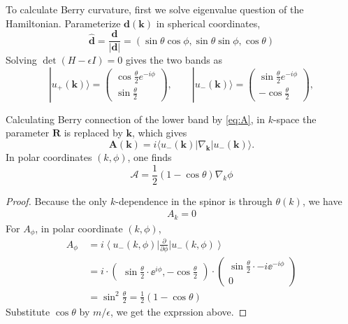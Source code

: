 \documentclass[12pt,a4paper]{article}
\newcommand{\bra}[1]{\left\langle{#1}\right|}
\newcommand{\ket}[1]{\left|{#1}\right\rangle}
\begin{document}
    To calculate Berry curvature, first we solve eigenvalue question of the Hamiltonian. Parameterize $\mathbf{d}(\mathbf{k})$ in spherical coordinates,
    \[
        \hat{\mathbf{d}}
        = \frac{\mathbf{d}}{|\mathbf{d}|}
        = (\sin\theta \cos\phi, \sin\theta \sin\phi, \cos\theta)
    \]
    Solving $\det(H-\epsilon I)=0$ gives the two bands as
    \begin{equation}
        |u_+(\mathbf k)\rangle =
        \begin{pmatrix}
        \cos\frac{\theta}{2}e^{-i\phi} \\
        \sin\frac{\theta}{2}
        \end{pmatrix}, \qquad
        |u_-(\mathbf k)\rangle =
        \begin{pmatrix}
        \sin\frac{\theta}{2}e^{-i\phi} \\
        -\cos\frac{\theta}{2}
        \end{pmatrix},
    \end{equation}

    Calculating Berry connection of the lower band by \eqref{eq:A}, in $k$-space the parameter $\mathbf{R}$ is replaced by $\mathbf{k}$, which gives
    \begin{equation}
        \mathbf A(\mathbf k)
        = i \langle u_-(\mathbf k) | \nabla_{\mathbf k} |u_-(\mathbf k)\rangle.
    \end{equation}
    In polar coordinates $(k,\phi)$, one finds
    \begin{equation}
        \mathcal{A} = \frac{1}{2}\left(1 - \cos\theta\right) \nabla_k\phi
    \end{equation}
    \begin{proof}\small
    Because the only $k$-dependence in the spinor is through $\theta(k)$, we have
    \[\begin{aligned}
        A_k = 0
    \end{aligned}\]
    For $A_\phi$, in polar coordinate $(k,\phi)$,
    \[\begin{aligned}
        A_\phi
        &\, = i \bra{u_-(k, \phi)} \frac{\partial}{\partial \phi} \ket{u_-(k, \phi)} \\
        &\, = i \cdot \begin{pmatrix}
            \sin\frac{\theta}{2}\cdot \ee^{i\phi}, -\cos\frac{\theta}{2}
        \end{pmatrix} \cdot
        \begin{pmatrix}
            \sin\frac{\theta}{2}\cdot -i\ee^{-i\phi} \\ 0
        \end{pmatrix} \\
        &\, = \sin^2\frac{\theta}{2} = \frac{1}{2} \left(1-\cos\theta\right)
    \end{aligned}\]
    Substitute $\cos\theta$ by $m/\epsilon$, we get the exprssion above.
    \end{proof}
\end{document}
